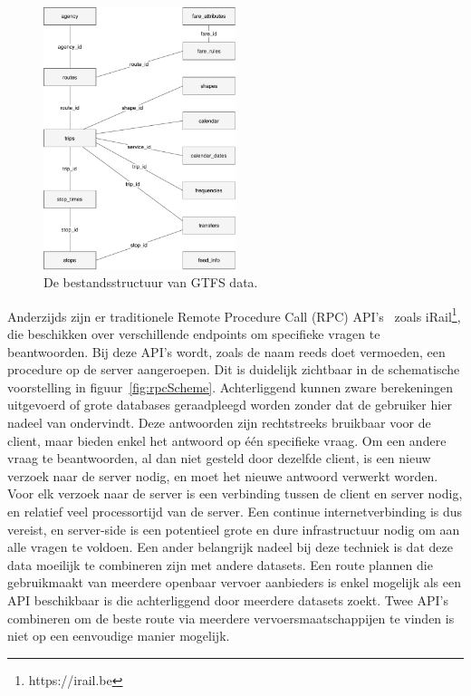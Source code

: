 \begin{figure}
	\centering
	\includegraphics[width=0.5\textwidth]{images/GTFS_scheme.pdf}
		\caption[GTFS structuur]{De bestandsstructuur van GTFS data.}
	\label{fig:gtfsScheme}
\end{figure}
 
Anderzijds zijn er traditionele Remote Procedure Call (RPC) API's~\citep{Nelson81} zoals iRail\footnote{https://irail.be}, die beschikken over verschillende endpoints om specifieke vragen te beantwoorden. Bij deze API's wordt, zoals de naam reeds doet vermoeden, een procedure op de server aangeroepen. Dit is duidelijk zichtbaar in de schematische voorstelling in figuur~\ref{fig:rpcScheme}. Achterliggend kunnen zware berekeningen uitgevoerd of grote databases geraadpleegd worden zonder dat de gebruiker hier nadeel van ondervindt. Deze antwoorden zijn rechtstreeks bruikbaar voor de client, maar bieden enkel het antwoord op één specifieke vraag. Om een andere vraag te beantwoorden, al dan niet gesteld door dezelfde client, is een nieuw verzoek naar de server nodig, en moet het nieuwe antwoord verwerkt worden. Voor elk verzoek naar de server is een verbinding tussen de client en server nodig, en relatief veel processortijd van de server. Een continue internetverbinding is dus vereist, en server-side is een potentieel grote en dure infrastructuur nodig om aan alle vragen te voldoen. Een ander belangrijk nadeel bij deze techniek is dat deze data moeilijk te combineren zijn met andere datasets. Een route plannen die gebruikmaakt van meerdere openbaar vervoer aanbieders is enkel mogelijk als een API beschikbaar is die achterliggend door meerdere datasets zoekt. Twee API's combineren om de beste route via meerdere vervoersmaatschappijen te vinden is niet op een eenvoudige manier mogelijk.

